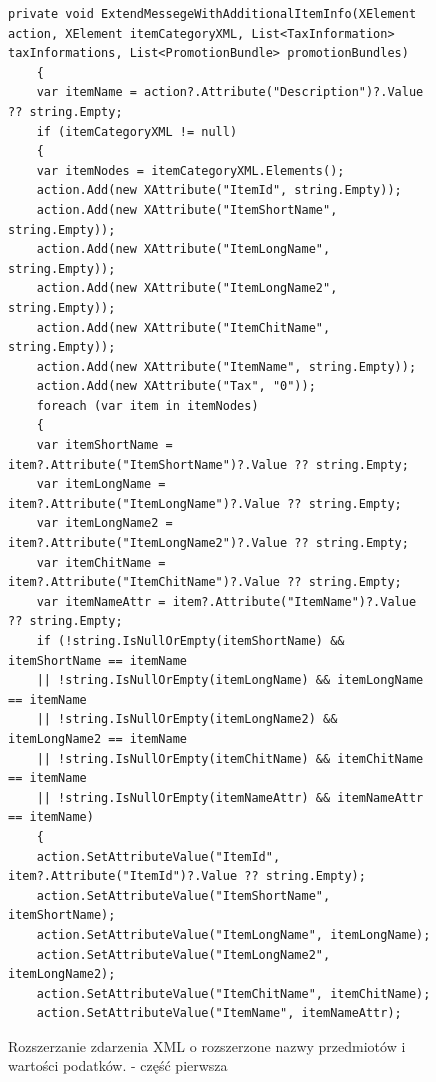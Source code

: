 \documentclass[a4paper]{book}
\begin{document}
\begin{figure}[t]
	\begin{lstlisting}[frame=single, breaklines=true]
	private void ExtendMessegeWithAdditionalItemInfo(XElement action, XElement itemCategoryXML, List<TaxInformation> taxInformations, List<PromotionBundle> promotionBundles)
	{
	var itemName = action?.Attribute("Description")?.Value ?? string.Empty;
	if (itemCategoryXML != null)
	{
	var itemNodes = itemCategoryXML.Elements();
	action.Add(new XAttribute("ItemId", string.Empty));
	action.Add(new XAttribute("ItemShortName", string.Empty));
	action.Add(new XAttribute("ItemLongName", string.Empty));
	action.Add(new XAttribute("ItemLongName2", string.Empty));
	action.Add(new XAttribute("ItemChitName", string.Empty));
	action.Add(new XAttribute("ItemName", string.Empty));
	action.Add(new XAttribute("Tax", "0"));
	foreach (var item in itemNodes)
	{
	var itemShortName = item?.Attribute("ItemShortName")?.Value ?? string.Empty;
	var itemLongName = item?.Attribute("ItemLongName")?.Value ?? string.Empty;
	var itemLongName2 = item?.Attribute("ItemLongName2")?.Value ?? string.Empty;
	var itemChitName = item?.Attribute("ItemChitName")?.Value ?? string.Empty;
	var itemNameAttr = item?.Attribute("ItemName")?.Value ?? string.Empty;	
	if (!string.IsNullOrEmpty(itemShortName) && itemShortName == itemName
	|| !string.IsNullOrEmpty(itemLongName) && itemLongName == itemName
	|| !string.IsNullOrEmpty(itemLongName2) && itemLongName2 == itemName
	|| !string.IsNullOrEmpty(itemChitName) && itemChitName == itemName
	|| !string.IsNullOrEmpty(itemNameAttr) && itemNameAttr == itemName)
	{
	action.SetAttributeValue("ItemId", item?.Attribute("ItemId")?.Value ?? string.Empty);
	action.SetAttributeValue("ItemShortName", itemShortName);
	action.SetAttributeValue("ItemLongName", itemLongName);
	action.SetAttributeValue("ItemLongName2", itemLongName2);
	action.SetAttributeValue("ItemChitName", itemChitName);
	action.SetAttributeValue("ItemName", itemNameAttr);
	\end{lstlisting}
	\caption{Rozszerzanie zdarzenia XML o rozszerzone nazwy przedmiotów i wartości podatków. - część pierwsza}
	\label{lst:rozszerzanieXML1}
\end{figure}
\end{document}

